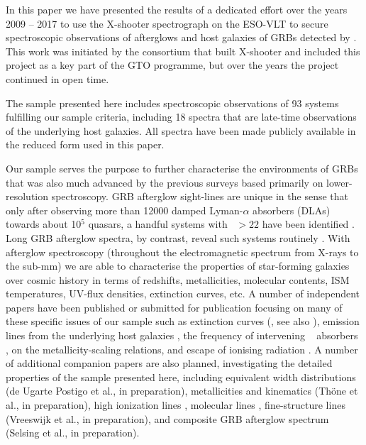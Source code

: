 \documentclass[longauth]{aa}    %
\begin{document}
In this paper we have presented the results of a dedicated effort over the years
2009 -- 2017 to use the X-shooter spectrograph on the ESO-VLT to secure
spectroscopic observations of afterglows and host galaxies of GRBs detected by
\swift. This work was initiated by the consortium that built X-shooter and
included this project as a key part of the GTO programme, but over the years the
project continued in open time.

The sample presented here includes spectroscopic observations of 93 systems
fulfilling our sample criteria, including 18 spectra that are late-time
observations of the underlying host galaxies. All spectra have been made
publicly available in the reduced form used in this paper.

Our sample serves the purpose to further characterise the environments of GRBs
that was also much advanced by the previous surveys based primarily on
lower-resolution spectroscopy. GRB afterglow sight-lines are unique in the sense
that only after observing more than 12000 damped Lyman-$\alpha$ absorbers (DLAs)
towards about 10$^5$ quasars, a handful systems with \nh~$ > 22$ have been
identified \citep[for instance five in][]{Noterdaeme2012b}. Long GRB afterglow
spectra, by contrast, reveal such systems routinely \citep[][and this
work]{Jakobsson2006b, Fynbo2009, Cucchiara2015}. With afterglow spectroscopy
(throughout the electromagnetic spectrum from X-rays to the sub-mm) we are able
to characterise the properties of star-forming galaxies over cosmic history in
terms of redshifts, metallicities, molecular contents, ISM temperatures, UV-flux
densities, extinction curves, etc.  A number of independent papers have been
published or submitted for publication focusing on many of these specific issues
of our sample such as extinction curves (\citealt{Japelj2015, 2018MNRAS.480..108Z,
	2018MNRAS.479.1542Z}, see also \citealt{Fynbo2014,
	Heintz2017a}), emission lines from the underlying host galaxies
\citep{Kruhler2015}, the frequency of intervening \mgii~ absorbers
\citep{Christensen2017}, \citet{Arabsalmani2018} on the metallicity-scaling
relations, and escape of ionising radiation \citep{Tanvir2017}. A number of
additional companion papers are also planned, investigating the detailed
properties of the sample presented here, including equivalent width
distributions (de Ugarte Postigo et al., in preparation), metallicities and
kinematics (Th{\"o}ne et al., in preparation), high ionization lines \citep{2018MNRAS.479.3456H}, molecular lines \citep{Bolmer2018}, fine-structure lines
(Vreeswijk et al., in preparation), and composite GRB afterglow spectrum
(Selsing et al., in preparation).
\end{document}
